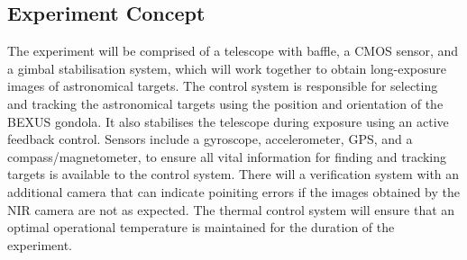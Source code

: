 \subsection{Experiment Concept}

The experiment will be comprised of a telescope with baffle, a CMOS sensor, and a gimbal stabilisation system, which will work together to obtain long-exposure images of astronomical targets. The control system is responsible for selecting and tracking the astronomical targets using the position and orientation of the BEXUS gondola. It also stabilises the telescope during exposure using an active feedback control. Sensors include a gyroscope, accelerometer, GPS, and a compass/magnetometer, to ensure all vital information for finding and tracking targets is available to the control system. There will a verification system with an additional camera that can indicate poiniting errors if the images obtained by the NIR camera are not as expected. The thermal control system will ensure that an optimal operational temperature is maintained for the duration of the experiment.
